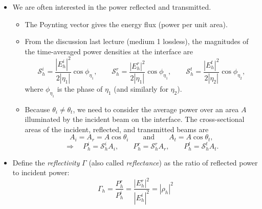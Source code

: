 \documentclass[11pt, oneside]{article}
\begin{document}
\begin{itemize}
	\item We are often interested in the power reflected and transmitted.
	\begin{itemize}
		\item[$\hookrightarrow$] The Poynting vector gives the energy flux (power per unit area).
		\item[$\hookrightarrow$] From the discussion last lecture (medium 1 lossless), the magnitudes of the time-averaged power densities at the interface are
		\begin{equation}
			\mathcal{S}_h^i = \frac{|E_h^i|^2}{2|\eta_1|}\cos\phi_{\eta_1}, \qquad
			\mathcal{S}_h^r = \frac{|E_h^r|^2}{2|\eta_1|}\cos\phi_{\eta_1}, \qquad
			\mathcal{S}_h^t = \frac{|E_h^t|^2}{2|\eta_2|}\cos\phi_{\eta_2},
		\end{equation}
		where $\phi_{\eta_1}$ is the phase of $\eta_1$ (and similarly for $\eta_2$).
		\item[$\hookrightarrow$] Because $\theta_i \ne \theta_t$, we need to consider the average power over an area $A$ illuminated by the incident beam on the interface. The cross-sectional areas of the incident, reflected, and transmitted beams are
		\begin{equation}
			A_i = A_r = A\cos\theta_i \qquad \text{and} \qquad A_t = A\cos\theta_t,
		\end{equation}
		\begin{equation}
			\Rightarrow\quad P_h^i = \mathcal{S}_h^iA_i, \qquad P_h^r = \mathcal{S}_h^rA_r, \qquad P_h^t = \mathcal{S}_h^tA_t.
		\end{equation}
	\end{itemize}
	\item Define the \emph{reflectivity} $\Gamma$ (also called \emph{reflectance}) as the ratio of reflected power to incident power:
	\begin{equation}
		\boxed{\Gamma_h = \frac{P_h^r}{P_h^i} = \frac{|E_h^r|^2}{|E_h^i|^2} = |\rho_h|^2}

\end{equation}
\end{itemize}
\end{document}
